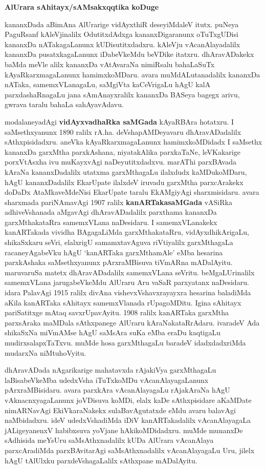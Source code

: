 \documentclass[11pt,a4size]{article}
\begin{document}
\bigskip
\centerline{\textbf{\Large{AlUrara sAhitayx/sAMsakxqqtika koDuge}}}
\medskip

kananxDada aBimAna AlUrarige vidAyxthiR deseyiMdaleV itutx. puNeya
PaguRsanf kAleVjinalilx OdutitxdAdxga kananxDigaranunx oTuTxgUDisi
kananxDa nATakagaLanunx kUDisutitxdadxru. kAleVju vAcanAlayadalilx
kananxDa pusatxkagaLanunx iDabeVkeMdu beVDike itatxru. dhAravADakekx
baMda meVle alilx kananxDa vAtAvaraNa nimiRsalu bahaLaSuTx
kAyaRkarxmagaLanunx hamimxkoMDaru. avara muMdALutanadalilx kananxDa
nATaka, samemxVLanagaLu, saMgiVta kaCeVrigaLu hAgU kalA
parxdashaRnagaLu jana sAmAnayxralilx kananxDa BASeya bagegx arivu,
gwrava taralu bahaLa sahAyavAdavu.

modalaneyadAgi \textbf{vidAyxvadhaRka saMGada} kAyaRBAra hotatxru. I
saMsethxyanunx 1890 ralilx rA.ha. deVshapAMDeyavaru dhAravADadalilx
sAthxpisidadxru. aneVka kAyaRkarxmagaLanunx hamimxkoMDidadx I saMsethx
kananxDa garxMtha parxkAshana, niyatakAlika parxkaTaNe, leVKakarige
porxVtAsxha ivu muKayxvAgi naDeyutitxdadxvu. marAThi parxBAvada kAraNa
kananxDadalilx utatxma garxMthagaLu ilalxdudx kaMDukoMDaru, hAgU
kananxDadalilx EkarUpate ilalxdeV iruvadu garxMtha parxcArakekx doDaDx
AtaMkaveMdeNisi EkarUpate taralu EkAMgiyAgi sharxmisidaru. avara
sharxmada pariNAma\-vAgi 1907 ralilx \textbf{kanARTakasaMGada} vASiRka
adhiveVshanada aMgavAgi dhAravADadalilx parxthama kananxDa
garxMthakataRra samemxVLana naDesidaru. I samemxVLanakekx kanARTakada
vividha BAgagaLiMda garxMthakataRru, vidAyxdhikArigaLu, shikaSxkaru
seVri, elalxrigU samamxtavAguva riVtiyalilx garxMthagaLa
racaneyAgabeVku hAgU `kanARTaka garxMthamAle' eMba hesarina
parxkAshaka saMsethxyanunx pArxraMBisuva tiVmARna
mADalAyitu. maruvaruSa matetx dhAravADadalilx samemxVLana
seVritu. beMgaLUrinalilx samemxVLana jarugabeVkeMdu AlUraru Aru vaSaR
parxyatanx naDesidaru. idara PalavAgi 1915 ralilx divAna
vishevxVshavxrayayxra hesarina baladiMda aKila kanARTaka sAhitayx
samemxVlanada rUpagoMDitu. I\-gina sAhitayx pariSatitxge mAtaq
savxrUpavAyitu. 1908 ralilx kanARTaka garxMtha parxsAraka maMDala
sAthxpanege AlUraru kAraNakataRrAdaru. ivaradeV Ada shikaSxNa miVmAMse
hAgU saMsAra suKa eMba eraDu kaqtigaLu mudirxsalapxTaTxvu. muMde hosa
garxMthagaLu baradeV idadxdadxriMda mudarxNa niMtuhoVyitu.

dhAravADada nAgarikarige mahatavxda rAjakiVya garxMthagaLu
laBisabeVkeMba udedxVsha iTuTxkoMDu vAcanAlayagaLanunx
pArxraMBisidaru. avara parxkAra vAcanAlayagaLu rAjakAraNa hAgU
vAknacnxyagaLanunx joVDisuva koMDi, elalx kaDe sAthxpisidare aKaMDate
nimARNavAgi EkiVkaraNakekx sulaBavAgutatxde eMdu avaru balavAgi
naMbidadxru. ideV udedxVshadiMda iDiV kanARTakadalilx vAcanAlayagaLa
jALigeyanenxV habibxsuva yoVjane hAkikoMDidadxru. muMde munanxDe
sAdhisida meYsUru saMsAthxnadalilx kUDa AlUrara vAcanAlaya
parxcAradiMda parxBAvitarAgi saMsAthxnadalilx vAcanAlayagaLu Uru,
jilelx hAgU tAlUlxku parxdeVshagaLalilx sAthxpane mADalAyitu.
\end{document}
